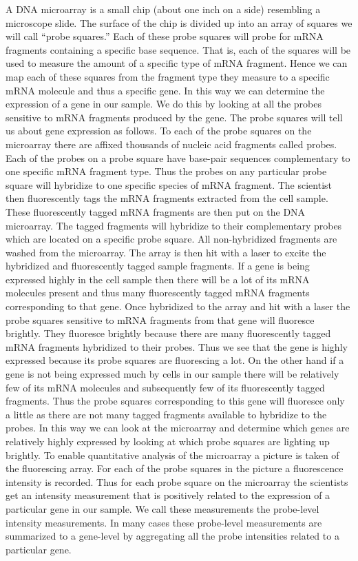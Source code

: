 \documentclass[reqno,12pt,oneside]{report}\usepackage[]{graphicx}\usepackage[]{color}
\theoremstyle{plain}
\theoremstyle{definition}
\theoremstyle{remark}
\numberwithin{theorem}{chapter}     %
\begin{document}
A DNA microarray is a small chip (about one inch on a side) resembling a microscope slide. The surface of the chip is divided up into an array of squares we will call ``probe squares.'' Each of these probe squares will probe for mRNA fragments containing a specific base sequence. That is, each of the squares will be used to measure the amount of a specific type of mRNA fragment. Hence we can map each of these squares from the fragment type they measure to a specific mRNA molecule and thus a specific gene. In this way we can determine the expression of a gene in our sample. We do this by looking at all the probes sensitive to mRNA fragments produced by the gene. The probe squares will tell us about gene expression as follows. To each of the probe squares on the microarray there are affixed thousands of nucleic acid fragments called probes. Each of the probes on a probe square have base-pair sequences complementary to one specific mRNA fragment type. Thus the probes on any particular probe square will hybridize to one specific species of mRNA fragment. The scientist then fluorescently tags the mRNA fragments extracted from the cell sample. These fluorescently tagged mRNA fragments are then put on the DNA microarray. The tagged fragments will hybridize to their complementary probes which are located on a specific probe square. All non-hybridized fragments are washed from the microarray. The array is then hit with a laser to excite the hybridized and fluorescently tagged sample fragments. If a gene is being expressed highly in the cell sample then there will be a lot of its mRNA molecules present and thus many fluorescently tagged mRNA fragments corresponding to that gene. Once hybridized to the array and hit with a laser the probe squares sensitive to mRNA fragments from that gene will fluoresce brightly. They fluoresce brightly because there are many fluorescently tagged mRNA  fragments hybridized to their probes. Thus we see that the gene is highly expressed because its probe squares are fluorescing a lot. On the other hand if a gene is not being expressed much by cells in our sample there will be relatively few of its mRNA molecules and subsequently few of its fluorescently tagged fragments. Thus the probe squares corresponding to this gene will fluoresce only a little as there are not many tagged fragments available to hybridize to the probes. In this way we can look at the microarray and determine which genes are relatively highly expressed by looking at which probe squares are lighting up brightly. To enable quantitative analysis of the microarray a picture is taken of the fluorescing array. For each of the probe squares in the picture a fluorescence intensity is recorded. Thus for each probe square on the microarray the scientists get an intensity measurement that is positively related to the expression of a particular gene in our sample. We call these measurements the probe-level intensity measurements. In many cases these probe-level measurements are summarized to a gene-level by aggregating all the probe intensities related to a particular gene. 
\end{document}
